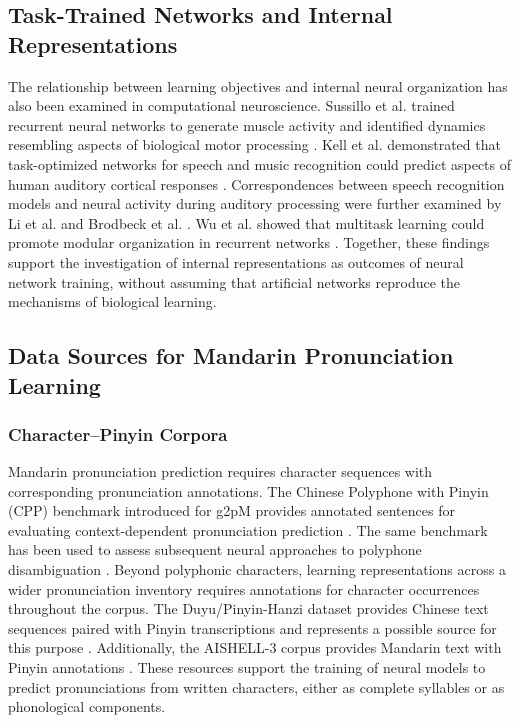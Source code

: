 \subsection{Task-Trained Networks and Internal Representations}
\label{sec:lr-task-trained}

The relationship between learning objectives and internal neural organization
has also been examined in computational neuroscience. Sussillo et al. trained
recurrent neural networks to generate muscle activity and identified dynamics
resembling aspects of biological motor processing \cite{ref_sussillo2015}. Kell
et al. demonstrated that task-optimized networks for speech and music
recognition could predict aspects of human auditory cortical responses
\cite{ref_kell2018}. Correspondences between speech recognition models and
neural activity during auditory processing were further examined by Li et al.
and Brodbeck et al. \cite{ref_li_auditory2023,ref_brodbeck2025}. Wu et al.
showed that multitask learning could promote modular organization in recurrent
networks \cite{ref_wu2026}. Together, these findings support the investigation
of internal representations as outcomes of neural network training, without
assuming that artificial networks reproduce the mechanisms of biological
learning.


\subsection{Data Sources for Mandarin Pronunciation Learning}
\label{sec:lr-data}

\subsubsection{Character--Pinyin Corpora}
\label{sec:lr-corpora}

Mandarin pronunciation prediction requires character sequences with
corresponding pronunciation annotations. The Chinese Polyphone with Pinyin (CPP)
benchmark introduced for g2pM provides annotated sentences for evaluating
context-dependent pronunciation prediction \cite{ref_g2pm2020}. The same
benchmark has been used to assess subsequent neural approaches to polyphone
disambiguation \cite{ref_g2pw2022}. Beyond polyphonic characters, learning
representations across a wider pronunciation inventory requires annotations for
character occurrences throughout the corpus. The Duyu/Pinyin-Hanzi dataset
provides Chinese text sequences paired with Pinyin transcriptions and represents
a possible source for this purpose \cite{ref_duyu}. Additionally, the AISHELL-3
corpus provides Mandarin text with Pinyin annotations \cite{ref_aishell32021}.
These resources support the training of neural models to predict pronunciations
from written characters, either as complete syllables or as phonological
components.

